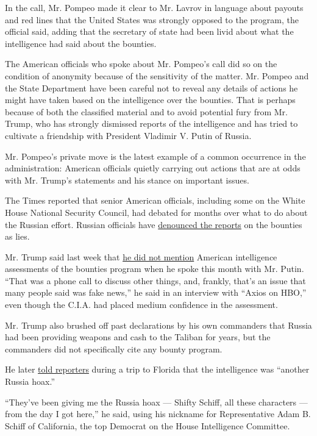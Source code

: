 In the call, Mr. Pompeo made it clear to Mr. Lavrov in language about
payouts and red lines that the United States was strongly opposed to the
program, the official said, adding that the secretary of state had been
livid about what the intelligence had said about the bounties.

The American officials who spoke about Mr. Pompeo's call did so on the
condition of anonymity because of the sensitivity of the matter. Mr.
Pompeo and the State Department have been careful not to reveal any
details of actions he might have taken based on the intelligence over
the bounties. That is perhaps because of both the classified material
and to avoid potential fury from Mr. Trump, who has strongly dismissed
reports of the intelligence and has tried to cultivate a friendship with
President Vladimir V. Putin of Russia.

Mr. Pompeo's private move is the latest example of a common occurrence
in the administration: American officials quietly carrying out actions
that are at odds with Mr. Trump's statements and his stance on important
issues.

The Times reported that senior American officials, including some on the
White House National Security Council, had debated for months over what
to do about the Russian effort. Russian officials have
\href{https://www.nytimes3xbfgragh.onion/2020/07/03/world/europe/russia-bounties-putin-afghanistan.html}{denounced
the reports} on the bounties as lies.

Mr. Trump said last week that
\href{https://www.nytimes3xbfgragh.onion/2020/07/29/us/politics/trump-putin-bounties.html}{he
did not mention} American intelligence assessments of the bounties
program when he spoke this month with Mr. Putin. ``That was a phone call
to discuss other things, and, frankly, that's an issue that many people
said was fake news,'' he said in an interview with ``Axios on HBO,''
even though the C.I.A. had placed medium confidence in the assessment.

Mr. Trump also brushed off past declarations by his own commanders that
Russia had been providing weapons and cash to the Taliban for years, but
the commanders did not specifically cite any bounty program.

He later
\href{https://www.whitehouse.gov/briefings-statements/remarks-president-trump-covid-19-response-storm-preparedness-roundtable-belleair-fl/}{told
reporters} during a trip to Florida that the intelligence was ``another
Russia hoax.''

``They've been giving me the Russia hoax --- Shifty Schiff, all these
characters --- from the day I got here,'' he said, using his nickname
for Representative Adam B. Schiff of California, the top Democrat on the
House Intelligence Committee.

